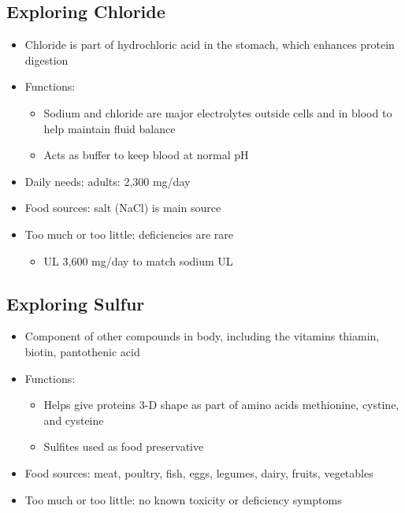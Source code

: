 \documentclass[12pt]{article}
\begin{document}
        \subsection{Exploring Chloride}
            \begin{itemize}
                \item Chloride is part of hydrochloric acid in the stomach, which enhances protein digestion
                \item Functions:
                    \begin{itemize}
                        \item Sodium and chloride are major electrolytes outside cells and in blood to help maintain fluid balance
                        \item Acts as buffer to keep blood at normal pH
                    \end{itemize}
                \item Daily needs: adults: 2,300 mg/day
                \item Food sources: salt (NaCl) is main source
                \item Too much or too little: deficiencies are rare
                    \begin{itemize}
                        \item UL 3,600 mg/day to match sodium UL
                    \end{itemize}
            \end{itemize}

        \subsection{Exploring Sulfur}
            \begin{itemize}
                \item Component of other compounds in body, including the vitamins thiamin, biotin, pantothenic acid
                \item Functions:
                    \begin{itemize}
                        \item Helps give proteins 3-D shape as part of amino acids methionine, cystine, and cysteine
                        \item Sulfites used as food preservative
                    \end{itemize}
                \item Food sources: meat, poultry, fish, eggs, legumes, dairy, fruits, vegetables
                \item Too much or too little: no known toxicity or deficiency symptoms
            \end{itemize}
        
\end{document}

